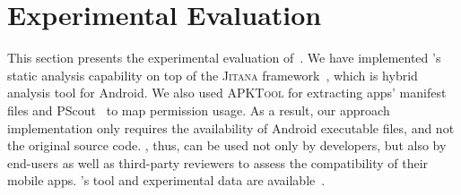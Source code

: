 \def \apitotalALL {68,268}
\def \apctotalALL {2,115}

\def \apicountALL {1,471}
\def \apiprcntALL {41.19\%}
\def \apicountZOO {878}
\def \apicountFDR {593}

\def \apccountALL {761}
\def \apcprcntALL {20.05\%}
\def \apccountZOO {464}
\def \apccountFDR {252}

\def \andzooct {2,180}
\def \fdroidct {1,391}

\def \prqcount {224}
\def \prqprcnt {12.34\%}
\def \prqtotal {1,815}

\def \prvcount {1,206}
\def \prvprcnt {68.68\%}
\def \prvtotal {1,756}

\def \prmcount {1,430}
\def \prmprcnt {40.04\%}

\def \rqoneapps {19}

\section{Experimental Evaluation}
\label{sec-eval}

This section presents the experimental evaluation of~\@approach. 
We have implemented \@approach's static analysis capability on top of the \textsc{Jitana} framework~\cite{tsutano2017efficient}, %
which is hybrid analysis tool for Android.
We also used \textsc{APKTool} \cite{apktool} for %
extracting apps' manifest files and PScout~\cite{au2012pscout} to map permission usage.
As a result, our approach implementation only requires the availability of Android executable files, and not the original source code. \@approach, thus, can be used not only by developers, but also by end-users as well as third-party reviewers to assess the compatibility of their mobile apps.
\@approach's tool and experimental data are available~\cite{GainDroid}.


